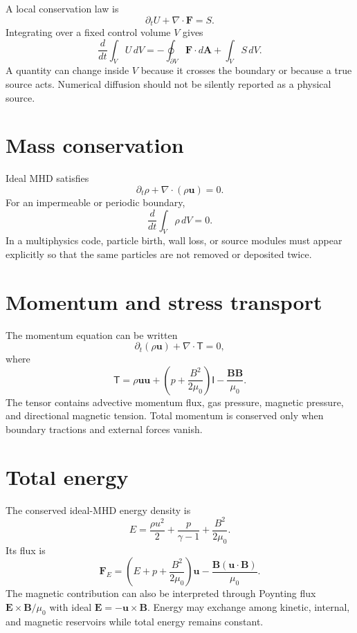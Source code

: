 \documentclass[11pt]{article}
\begin{document}
A local conservation law is
\begin{equation}
\partial_tU+\nabla\cdot\mathbf F=S.
\end{equation}
Integrating over a fixed control volume $V$ gives
\begin{equation}
\frac{d}{dt}\int_VU\,dV
=-\oint_{\partial V}\mathbf F\cdot d\mathbf A+\int_VS\,dV.
\end{equation}
A quantity can change inside $V$ because it crosses the boundary or because a true source acts. Numerical diffusion should not be silently reported as a physical source.


\section{Mass conservation}

Ideal MHD satisfies
\begin{equation}
\partial_t\rho+\nabla\cdot(\rho\mathbf u)=0.
\end{equation}
For an impermeable or periodic boundary,
\begin{equation}
\frac{d}{dt}\int_V\rho\,dV=0.
\end{equation}
In a multiphysics code, particle birth, wall loss, or source modules must appear explicitly so that the same particles are not removed or deposited twice.


\section{Momentum and stress transport}

The momentum equation can be written
\begin{equation}
\partial_t(\rho\mathbf u)+\nabla\cdot\mathsf T=0,
\end{equation}
where
\begin{equation}
\mathsf T=
\rho\mathbf u\mathbf u+
\left(p+\frac{B^2}{2\mu_0}\right)\mathsf I
-\frac{\mathbf B\mathbf B}{\mu_0}.
\end{equation}
The tensor contains advective momentum flux, gas pressure, magnetic pressure, and directional magnetic tension. Total momentum is conserved only when boundary tractions and external forces vanish.


\section{Total energy}

The conserved ideal-MHD energy density is
\begin{equation}
E=\frac{\rho u^2}{2}+\frac{p}{\gamma-1}+\frac{B^2}{2\mu_0}.
\end{equation}
Its flux is
\begin{equation}
\mathbf F_E=
\left(E+p+\frac{B^2}{2\mu_0}\right)\mathbf u
-\frac{\mathbf B(\mathbf u\cdot\mathbf B)}{\mu_0}.
\end{equation}
The magnetic contribution can also be interpreted through Poynting flux $\mathbf E\times\mathbf B/\mu_0$ with ideal $\mathbf E=-\mathbf u\times\mathbf B$. Energy may exchange among kinetic, internal, and magnetic reservoirs while total energy remains constant.
\end{document}
